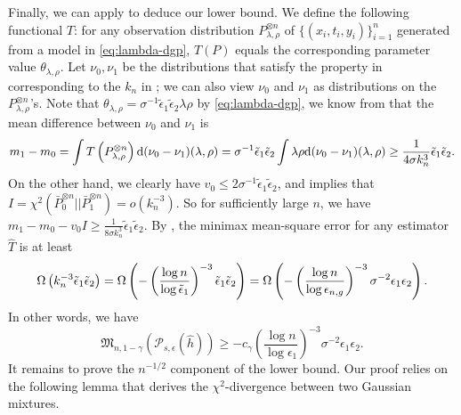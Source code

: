 \documentclass{article}
\def\eps{{\epsilon}}
\def\gP{{\mathcal{P}}}
\newcommand{\dd}{\textup{d}}
\begin{document}
Finally, we can apply  to deduce our lower bound. We define the following functional $T$: for any observation distribution $P_{\lambda,\rho}^{\otimes n}$ of $\{(x_i,t_i,y_i)\}_{i=1}^n$ generated from a model in \eqref{eq:lambda-dgp}, $T(P)$ equals the corresponding parameter value $\theta_{\lambda,\rho}$. Let $\nu_0,\nu_1$ be the distributions that satisfy the property in  corresponding to the $k_n$ in ; we can also view $\nu_0$ and $\nu_1$ as distributions on the $P_{\lambda,\rho}^{\otimes n}$'s. Note that $\theta_{\lambda,\rho}=\sigma^{-1}\tilde{\eps}_1\tilde{\eps}_2\lambda\rho$ by \eqref{eq:lambda-dgp}, we know from  that the mean difference between $\nu_0$ and $\nu_1$ is
\begin{equation}
    \notag
    m_1-m_0=\int T\left(P_{\lambda,\rho}^{\otimes n}\right)\dd (\nu_0-\nu_1)(\lambda,\rho) = \sigma^{-1}\tilde{\eps}_1\tilde{\eps}_2 \int \lambda\rho \dd (\nu_0-\nu_1)(\lambda,\rho) \geq \frac{1}{4\sigma k_n^3}\tilde{\eps}_1\tilde{\eps}_2.
\end{equation}
On the other hand, we clearly have $v_0 \leq 2\sigma^{-1}\tilde{\eps}_1\tilde{\eps}_2$, and  implies that $I = \chi^2\left(\bar{P}_0^{\otimes n} || \bar{P}_1^{\otimes n}\right) = o\left(k_n^{-3}\right)$. So for sufficiently large $n$, we have $m_1-m_0-v_0I\geq \frac{1}{8\sigma k_n^3}\tilde{\eps}_1\tilde{\eps}_2$. By , the minimax mean-square error for any estimator $\hat{T}$ is at least
\begin{equation}
    \notag
    \Omega\left(k_n^{-3}\tilde{\eps}_1\tilde{\eps}_2\right) = \Omega\left(-\left(\frac{\log n}{\log \tilde{\eps}_1}\right)^{-3}\tilde{\eps}_1\tilde{\eps}_2\right) = \Omega\left(-\left(\frac{\log n}{\log \eps_{n,g}}\right)^{-3}\sigma^{-2}\eps_{1}\eps_{2}\right).
\end{equation}
In other words, we have
\begin{equation}
    \label{eq:gaussian-lower-bound-first-part}
    \mathfrak{M}_{n,1-\gamma}\left(\gP_{s,\eps}(\hat{h})\right) \geq  -c_{\gamma}\left(\frac{\log n}{\log \eps_1}\right)^{-3}\sigma^{-2}\eps_1\eps_2.
\end{equation}
It remains to prove the $n^{-1/2}$ component of the lower bound. Our proof relies on the following lemma that derives the $\chi^2$-divergence between two Gaussian mixtures.
\end{document}
